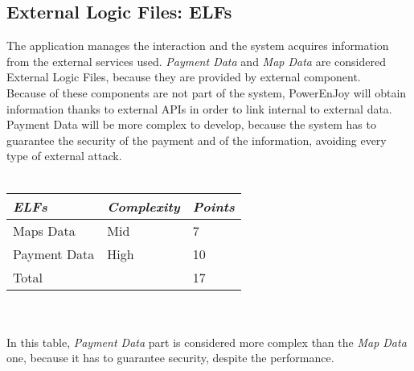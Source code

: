 \documentclass[11pt,a4paper]{report}
\begin{document}
\subsection{External Logic Files: ELFs}
The application manages the interaction and the system acquires information from the external services used.
\textit{Payment Data} and \textit{Map Data} are considered External Logic Files, because they are provided by external component.\\
Because of these components are not part of the system, PowerEnJoy will obtain information thanks to external APIs in order to link internal to external data.\\
Payment Data will be more complex to develop, because the system has to guarantee the security of the payment and of the information, avoiding every type of external attack.\\\\
\begin{tabularx}{\textwidth}{|X|X|X|}
	\hline
	\textit{ELFs} & \textit{Complexity} & \textit{Points}\\
	\hline
	Maps Data & Mid & 7\\
	Payment Data & High & 10\\
	\hline
	\hline
	Total & \multicolumn{1}{X}{}& \multicolumn{1}{X|}{17}\\
	\hline
\end{tabularx}
\\\\
In this table, \textit{Payment Data} part is considered more complex than the \textit{Map Data} one, because it has to guarantee security, despite the performance. 
\end{document}
